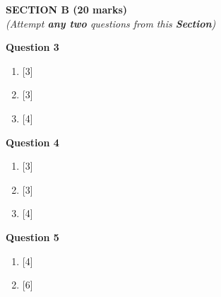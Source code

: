 \newpage
\begin{center}
   \large
   \textbf{SECTION B (20 marks)}\\
   \vspace{5mm}
   \normalsize
   \textit{(Attempt \textbf{any two} questions from this \textbf{Section})}
\end{center}
\par

\noindent
\textbf{Question 3}
\begin{enumerate}[label=(\roman*)]

    \item \hfill [3]

    \item \hfill [3]

    \item \hfill [4]

\end{enumerate}

\noindent
\textbf{Question 4}
\begin{enumerate}[label=(\roman*)]

    \item \hfill [3]

    \item \hfill [3]

    \item \hfill [4]

\end{enumerate}

\newpage
\noindent
\textbf{Question 5}
\begin{enumerate}[label=(\roman*)]

    \item \hfill [4]

    \item \hfill [6]

\end{enumerate}


